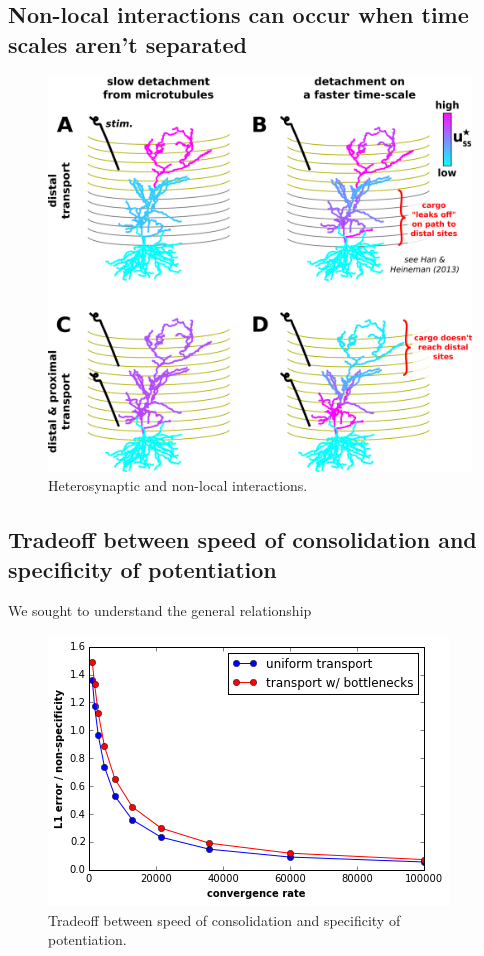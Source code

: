 \documentclass[fleqn,10pt]{wlpeerj}
\begin{document}
\subsection*{Non-local interactions can occur when time scales aren't separated}

\begin{figure}[h!]
\begin{center}
\includegraphics[width=0.7\columnwidth]{05_heterosynaptic.png}
\caption{Heterosynaptic and non-local interactions.
}
\end{center}
\end{figure}

\subsection*{Tradeoff between speed of consolidation and specificity of potentiation}

We sought to understand the general relationship

\begin{figure}[h!]
\begin{center}
\includegraphics[width=0.5\columnwidth]{tradeoff.png}
\caption{Tradeoff between speed of consolidation and specificity of potentiation.
}
\end{center}
\end{figure}
\end{document}
